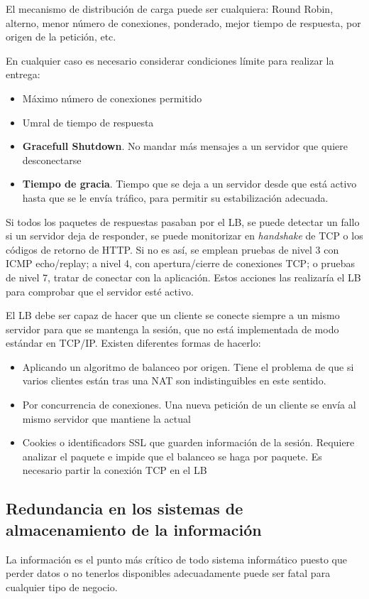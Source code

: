 \documentclass{apuntes}[nochap]
\newcounter{problem}
\begin{document}
El mecanismo de distribución de carga puede ser cualquiera: Round Robin, alterno, menor número de conexiones, ponderado, mejor tiempo de respuesta, por origen de la petición, etc.

En cualquier caso es necesario considerar condiciones límite para realizar la entrega:
\begin{itemize}
\item Máximo número de conexiones permitido
\item Umral de tiempo de respuesta
\item \textbf{Gracefull Shutdown}. No mandar más mensajes a un servidor que quiere desconectarse
\item \textbf{Tiempo de gracia}. Tiempo que se deja a un servidor desde que está activo hasta que se le envía tráfico, para permitir su estabilización adecuada.
\end{itemize}

Si todos los paquetes de respuestas pasaban por el LB, se puede detectar un fallo si un servidor deja de responder, se puede monitorizar en \textit{handshake} de TCP o los códigos de retorno de HTTP. Si no es así, se emplean pruebas de nivel 3 con ICMP echo/replay; a nivel 4, con apertura/cierre de conexiones TCP; o pruebas de nivel 7, tratar de conectar con la aplicación. Estos acciones las realizaría el LB para comprobar que el servidor esté activo.

El LB debe ser capaz de hacer que un cliente se conecte siempre a un mismo servidor para que se mantenga la sesión, que no está implementada de modo estándar en TCP/IP. Existen diferentes formas de hacerlo:
\begin{itemize}
\item Aplicando un algoritmo de balanceo por origen. Tiene el problema de que si varios clientes están tras una NAT son indistinguibles en este sentido.
\item Por concurrencia de conexiones. Una nueva petición de un cliente se envía al mismo servidor que mantiene la actual
\item Cookies o identificadors SSL que guarden información de la sesión. Requiere analizar el paquete e impide que el balanceo se haga por paquete. Es necesario partir la conexión TCP en el LB
\end{itemize}

\subsection{Redundancia en los sistemas de almacenamiento de la información}
La información es el punto más crítico de todo sistema informático puesto que perder datos o no tenerlos disponibles adecuadamente puede ser fatal para cualquier tipo de negocio.
\end{document}
